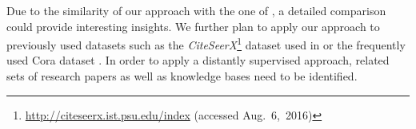 \bigskip

Due to the similarity of our approach with the one of \citet{lu2013web}, a detailed comparison could provide interesting insights.
We further plan to apply our approach to previously used datasets such as the \textit{CiteSeerX}\footnote{\url{http://citeseerx.ist.psu.edu/index} (accessed Aug.~6,~2016)} dataset used in \citet{councill2008parscit} or the frequently used Cora dataset \citep[e.g.][]{peng2004accurate,councill2008parscit,wu2014citeseerx}.
In order to apply a distantly supervised approach, related sets of research papers as well as knowledge bases need to be identified.

